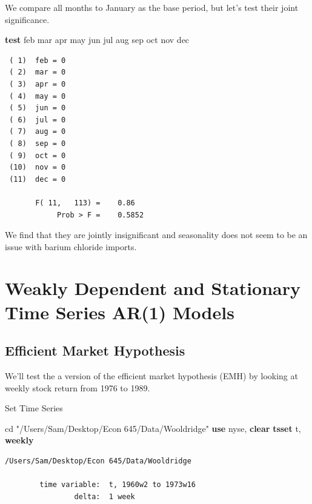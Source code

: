 \documentclass[
]{book}
\newenvironment{Shaded}{\begin{snugshade}}{\end{snugshade}}
\newcommand{\FunctionTok}[1]{\textcolor[rgb]{0.13,0.29,0.53}{\textbf{#1}}}
\newcommand{\KeywordTok}[1]{\textcolor[rgb]{0.13,0.29,0.53}{\textbf{#1}}}
\newcommand{\NormalTok}[1]{#1}
\newcommand{\StringTok}[1]{\textcolor[rgb]{0.31,0.60,0.02}{#1}}
\begin{document}
We compare all months to January as the base period, but let's test their
joint significance.

\begin{Shaded}
\begin{Highlighting}[]
\KeywordTok{test}\NormalTok{ feb mar apr may jun jul aug sep oct nov dec}
\end{Highlighting}
\end{Shaded}

\begin{verbatim}
 ( 1)  feb = 0
 ( 2)  mar = 0
 ( 3)  apr = 0
 ( 4)  may = 0
 ( 5)  jun = 0
 ( 6)  jul = 0
 ( 7)  aug = 0
 ( 8)  sep = 0
 ( 9)  oct = 0
 (10)  nov = 0
 (11)  dec = 0

       F( 11,   113) =    0.86
            Prob > F =    0.5852
\end{verbatim}

We find that they are jointly insignificant and seasonality does not seem
to be an issue with barium chloride imports.

\chapter{Weakly Dependent and Stationary Time Series AR(1) Models}\label{weakly-dependent-and-stationary-time-series-ar1-models}

\section{Efficient Market Hypothesis}\label{efficient-market-hypothesis}

We'll test the a version of the efficient market hypothesis (EMH) by looking
at weekly stock return from 1976 to 1989.

Set Time Series

\begin{Shaded}
\begin{Highlighting}[]
\NormalTok{cd }\StringTok{"/Users/Sam/Desktop/Econ 645/Data/Wooldridge"}
\KeywordTok{use}\NormalTok{ nyse, }\KeywordTok{clear}
\KeywordTok{tsset}\NormalTok{ t, }\FunctionTok{weekly}
\end{Highlighting}
\end{Shaded}

\begin{verbatim}
/Users/Sam/Desktop/Econ 645/Data/Wooldridge

        time variable:  t, 1960w2 to 1973w16
                delta:  1 week
\end{verbatim}
\end{document}

